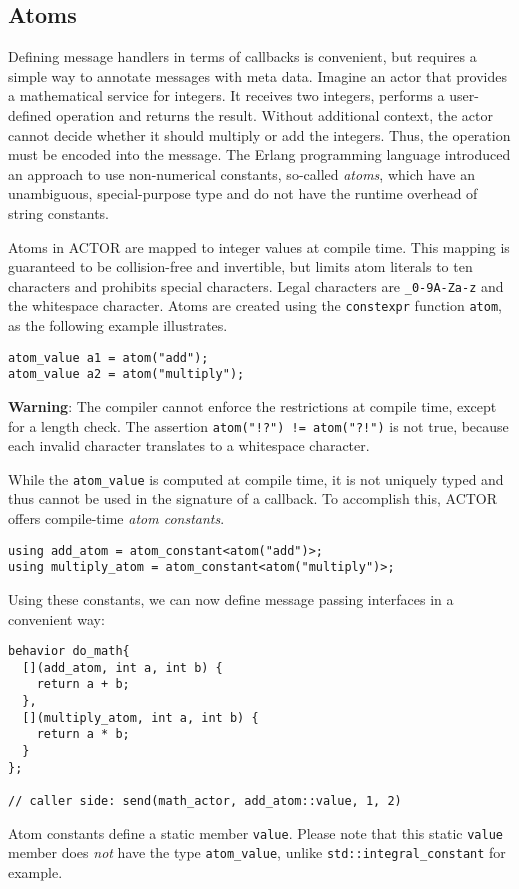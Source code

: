 \clearpage
\subsection{Atoms}
\label{atom}

Defining message handlers in terms of callbacks is convenient, but requires a
simple way to annotate messages with meta data. Imagine an actor that provides
a mathematical service for integers. It receives two integers, performs a
user-defined operation and returns the result. Without additional context, the
actor cannot decide whether it should multiply or add the integers. Thus, the
operation must be encoded into the message. The Erlang programming language
introduced an approach to use non-numerical constants, so-called
\textit{atoms}, which have an unambiguous, special-purpose type and do not have
the runtime overhead of string constants.

Atoms in ACTOR are mapped to integer values at compile time. This mapping is
guaranteed to be collision-free and invertible, but limits atom literals to ten
characters and prohibits special characters. Legal characters are
\lstinline^_0-9A-Za-z^ and the whitespace character. Atoms are created using
the \lstinline^constexpr^ function \lstinline^atom^, as the following example
illustrates.

\begin{lstlisting}
atom_value a1 = atom("add");
atom_value a2 = atom("multiply");
\end{lstlisting}

\textbf{Warning}: The compiler cannot enforce the restrictions at compile time,
except for a length check. The assertion \lstinline^atom("!?") != atom("?!")^
is not true, because each invalid character translates to a whitespace
character.

While the \lstinline^atom_value^ is computed at compile time, it is not
uniquely typed and thus cannot be used in the signature of a callback. To
accomplish this, ACTOR offers compile-time \emph{atom constants}.

\begin{lstlisting}
using add_atom = atom_constant<atom("add")>;
using multiply_atom = atom_constant<atom("multiply")>;
\end{lstlisting}

Using these constants, we can now define message passing interfaces in a
convenient way:

\begin{lstlisting}
behavior do_math{
  [](add_atom, int a, int b) {
    return a + b;
  },
  [](multiply_atom, int a, int b) {
    return a * b;
  }
};

// caller side: send(math_actor, add_atom::value, 1, 2)
\end{lstlisting}

Atom constants define a static member \lstinline^value^. Please note that this
static \lstinline^value^ member does \emph{not} have the type
\lstinline^atom_value^, unlike \lstinline^std::integral_constant^ for example.
